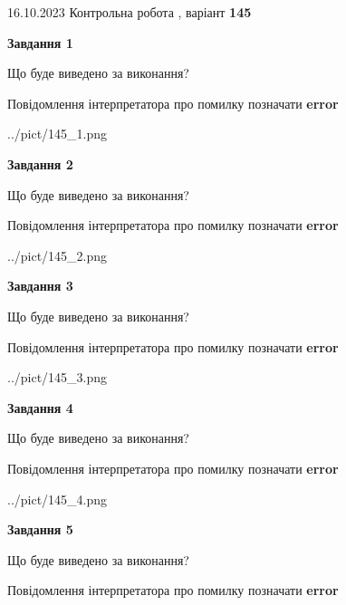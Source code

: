 \documentclass[12pt, ukrainian]{article}
\begin{document}
{\Large{16.10.2023 Контрольна робота , варіант  \No \textbf { 145 }\par}}
{
\begin {large}
{\begin {center}\textbf{Завдання 1}\end {center}}\par
Що буде виведено за виконання? \par
Повідомлення інтерпретатора про помилку позначати \textbf{error}

\begin{center}
	{../pict/145_1.png}
\end{center}
\newpage

{\begin {center}\textbf{Завдання 2}\end {center}}\par
Що буде виведено за виконання? \par
Повідомлення інтерпретатора про помилку позначати \textbf{error}

\begin{center}
	{../pict/145_2.png}
\end{center}
\newpage

{\begin {center}\textbf{Завдання 3}\end {center}}\par
Що буде виведено за виконання? \par
Повідомлення інтерпретатора про помилку позначати \textbf{error}

\begin{center}
	{../pict/145_3.png}
\end{center}
\newpage

{\begin {center}\textbf{Завдання 4}\end {center}}\par
Що буде виведено за виконання? \par
Повідомлення інтерпретатора про помилку позначати \textbf{error}

\begin{center}
	{../pict/145_4.png}
\end{center}
\newpage

{\begin {center}\textbf{Завдання 5}\end {center}}\par
Що буде виведено за виконання? \par
Повідомлення інтерпретатора про помилку позначати \textbf{error}


\end{large}}
\end{document}
